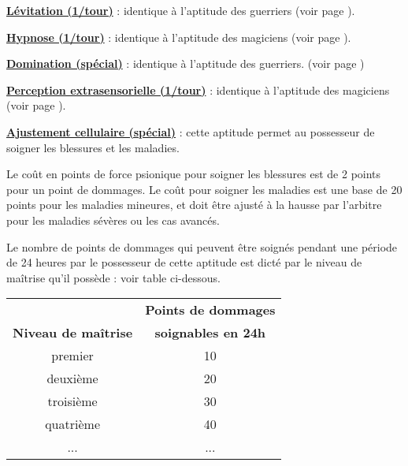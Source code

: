 \bigskip

\textbf{\uline{Lévitation (1/tour)}} : identique à l'aptitude des guerriers (voir page \pageref{guerrier-levitation}).

\bigskip

\textbf{\uline{Hypnose (1/tour)}} : identique à l'aptitude des magiciens (voir page \pageref{magicien-hypnose}).

\bigskip

\textbf{\uline{Domination (spécial)}} : identique à l'aptitude des guerriers. (voir page \pageref{guerrier-domination})

\bigskip

\textbf{\uline{Perception extrasensorielle (1/tour)}} : identique à l'aptitude des magiciens (voir page \pageref{magicien-ESP}).

\bigskip

\label{clerc-ajustement-cellulaire}\textbf{\uline{Ajustement cellulaire (spécial)}} : cette aptitude permet au possesseur de soigner les blessures et les maladies.

\bigskip

Le coût en points de force psionique pour soigner les blessures est de 2 points pour un point de dommages. Le coût pour soigner les maladies est une base de 20 points pour les maladies mineures, et doit être ajusté à la hausse par l'arbitre pour les maladies sévères ou les cas avancés.

\bigskip

Le nombre de points de dommages qui peuvent être soignés pendant une période de 24 heures par le possesseur de cette aptitude est dicté par le niveau de maîtrise qu'il possède : voir table ci-dessous.

\bigskip

\begin{tabular}{cc}
& \textbf{Points de dommages} \\
\textbf{Niveau de maîtrise} & \textbf{soignables en 24h} \\
premier     & 10 \\
deuxième    & 20 \\
troisième   & 30 \\
quatrième   & 40 \\
...         & ...\\
\end{tabular}

\bigskip

